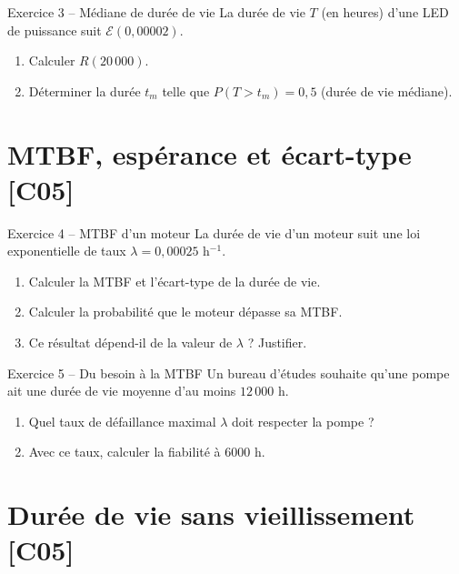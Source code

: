 \documentclass[a4paper,11pt]{article}
\begin{document}
\begin{exo}{Exercice 3 -- Médiane de durée de vie}
La durée de vie $T$ (en heures) d'une LED de puissance suit $\mathcal{E}(0{,}00002)$.
\begin{enumerate}[label=\alph*)]
  \item Calculer $R(20\,000)$.
  \item Déterminer la durée $t_m$ telle que $P(T > t_m) = 0{,}5$ (durée de vie médiane).
\end{enumerate}
\end{exo}

\section{MTBF, espérance et écart-type \hfill {\normalsize\color{uimmred}[C05]}}

\begin{exo}{Exercice 4 -- MTBF d'un moteur}
La durée de vie d'un moteur suit une loi exponentielle de taux $\lambda = 0{,}00025$ h$^{-1}$.
\begin{enumerate}[label=\alph*)]
  \item Calculer la MTBF et l'écart-type de la durée de vie.
  \item Calculer la probabilité que le moteur dépasse sa MTBF.
  \item Ce résultat dépend-il de la valeur de $\lambda$ ? Justifier.
\end{enumerate}
\end{exo}

\begin{exo}{Exercice 5 -- Du besoin à la MTBF}
Un bureau d'études souhaite qu'une pompe ait une durée de vie moyenne d'au moins $12\,000$ h.
\begin{enumerate}[label=\alph*)]
  \item Quel taux de défaillance maximal $\lambda$ doit respecter la pompe ?
  \item Avec ce taux, calculer la fiabilité à $6000$ h.
\end{enumerate}
\end{exo}

\section{Durée de vie sans vieillissement \hfill {\normalsize\color{uimmred}[C05]}}
\end{document}
